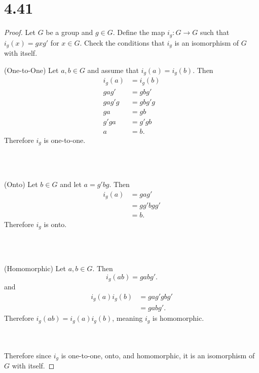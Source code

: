 \documentclass[12pt]{extarticle}
\begin{document}
\section*{4.41}
\begin{proof}
	Let $G$ be a group and $g \in G$. Define the map $i_g : G \to G$ such that $i_g(x) = gxg'$ for $x \in G$. Check the conditions that $i_g$ is an isomorphism of $G$ with itself. \\

	\quad\begin{minipage}{\dimexpr\textwidth-2cm}
		(One-to-One)\quad
		Let $a,b \in G$ and assume that $i_g (a) = i_g (b)$. Then
		\begin{align*}
			i_g(a) &= i_g(b) \\
			gag' &= gbg' \\
			gag'g &= gbg'g \\
			ga &= gb \\
			g'ga &= g'gb \\
			a &= b
		.\end{align*}
		Therefore $i_g$ is one-to-one.
	\end{minipage} \\
	\\

	\quad\begin{minipage}{\dimexpr\textwidth-2cm}
		(Onto)\quad
		Let $b \in G$ and let $a = g'bg$. Then
		\begin{align*}
			i_g(a) &= gag' \\
			&= gg'bgg' \\
			&= b
		.\end{align*}
		Therefore $i_g$ is onto.
	\end{minipage} \\
	\\

	\quad\begin{minipage}{\dimexpr\textwidth-2cm}
		(Homomorphic)\quad
		Let $a,b \in G$. Then
		\[
			i_g(ab) = gabg'
		.\]
		and
		\begin{align*}
			i_g(a)i_g(b) &= gag'gbg' \\
			&= gabg'
		.\end{align*}
		Therefore $i_g(ab) = i_g(a) i_g(b)$, meaning $i_g$ is homomorphic.
	\end{minipage} \\
	\\

	Therefore since $i_g$ is one-to-one, onto, and homomorphic, it is an isomorphism of $G$ with itself.

\end{proof}
	
\end{document}
